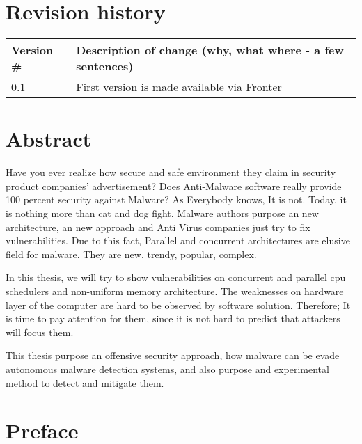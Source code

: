 \documentclass[medieteknikk]{gucmasterthesis}
\begin{document}
\thesisdate{\gucmasterthesisdate}
\makefrontpages %
\thesistitlepage %

\chapter*{Revision history}

\begin{center}
\begin{tabular}[H]{|l|p{35em}|}
\hline
Version \#  & Description of change (why, what where - a few sentences)\\
\hline
      0.1   & First version is made available via Fronter\\
\hline
\end{tabular}
\end{center}

\chapter*{Abstract}

Have you ever realize how secure and safe environment they claim in security product companies' advertisement? Does Anti-Malware software really provide 100 percent security against Malware? As Everybody knows, It is not. Today, it is nothing more than cat and dog fight. Malware authors purpose an new architecture, an new approach and Anti Virus companies just try to fix vulnerabilities. Due to this fact, Parallel and concurrent architectures are elusive field for malware. They are new, trendy, popular, complex. 

In this thesis, we will try to show vulnerabilities on concurrent and parallel cpu schedulers and non-uniform memory architecture. The weaknesses on hardware layer of the computer are hard to be observed by software solution. Therefore; It is time to pay attention for them, since it is not hard to predict that attackers will focus them.

This thesis purpose an offensive security approach, how malware can be evade autonomous malware detection systems, and also purpose and experimental method to detect and mitigate them.

\chapter*{Preface}
\end{document}
